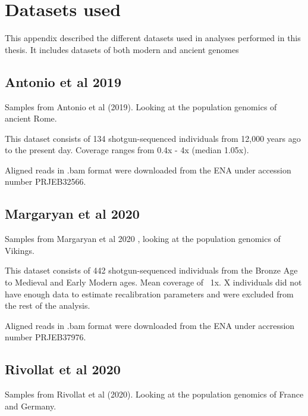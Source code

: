 
\appendix
\chapter{Datasets used}
\label{appendixlabel1}

This appendix described the different datasets used in analyses performed in this thesis. It includes datasets of both modern and ancient genomes 

\section{Antonio et al 2019}

Samples from Antonio et al (2019)\cite{antonio2019ancient}. Looking at the population genomics of ancient Rome. 

This dataset consists of 134 shotgun-sequenced individuals from 12,000 years ago to the present day. Coverage ranges from 0.4x - 4x (median 1.05x). 

Aligned reads in .bam format were downloaded from the ENA under accession number PRJEB32566.

\section{Margaryan et al 2020}

Samples from Margaryan et al 2020 \cite{margaryan2020population}, looking at the population genomics of Vikings.  

This dataset consists of 442 shotgun-sequenced individuals from the Bronze Age to Medieval and Early Modern ages. Mean coverage of ~1x. X individuals did not have enough data to estimate recalibration parameters and were excluded from the rest of the analysis.

Aligned reads in .bam format were downloaded from the ENA under accression number PRJEB37976. 

\section{Rivollat et al 2020}

Samples from Rivollat et al (2020)\cite{rivollat2020france}. Looking at the population genomics of France and Germany. 

